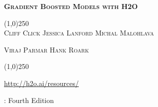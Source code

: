 








\thispagestyle{empty} %


\begin{center}
\textsc{\Large\bf{Gradient Boosted Models with H2O}}

\bigskip
\line(1,0){250}  %
\\
\bigskip
\small
\textsc{Cliff Click \hspace{10pt} Jessica Lanford \hspace{10pt} Michal Malohlava}

\textsc{Viraj Parmar \hspace{10pt} Hank Roark}

\normalsize

\line(1,0){250}  %

{\url{http://h2o.ai/resources/}}

\bigskip

\monthname \hspace{1pt}  \the\year: Fourth Edition 

\bigskip
\end{center}


\newpage
\restoregeometry

\null\vfill %

\thispagestyle{empty}%

